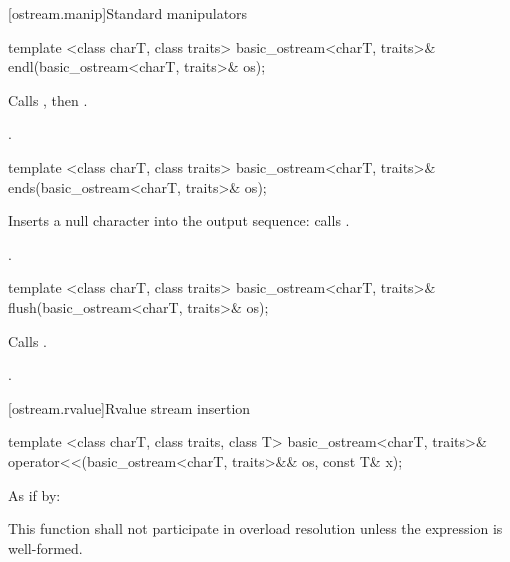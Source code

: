[ostream.manip]{Standard  manipulators}

%
\begin{itemdecl}
template <class charT, class traits>
  basic_ostream<charT, traits>& endl(basic_ostream<charT, traits>& os);
\end{itemdecl}

\begin{itemdescr}
\pnum
\effects
Calls
,
then
.

\pnum
\returns
{}.
\end{itemdescr}

%
\begin{itemdecl}
template <class charT, class traits>
  basic_ostream<charT, traits>& ends(basic_ostream<charT, traits>& os);
\end{itemdecl}

\begin{itemdescr}
\pnum
\effects
Inserts a null character into the output sequence:
calls
.

\pnum
\returns
{}.
\end{itemdescr}

%
\begin{itemdecl}
template <class charT, class traits>
  basic_ostream<charT, traits>& flush(basic_ostream<charT, traits>& os);
\end{itemdecl}

\begin{itemdescr}
\pnum
\effects
Calls
.

\pnum
\returns
{}.
\end{itemdescr}

[ostream.rvalue]{Rvalue stream insertion}

%
\begin{itemdecl}
template <class charT, class traits, class T>
  basic_ostream<charT, traits>&
  operator<<(basic_ostream<charT, traits>&& os, const T& x);
\end{itemdecl}

\begin{itemdescr}
\pnum
\effects As if by: 

\pnum
\returns {}

\pnum
\remarks This function shall not participate in overload resolution
unless the expression  is well-formed.
\end{itemdescr}


